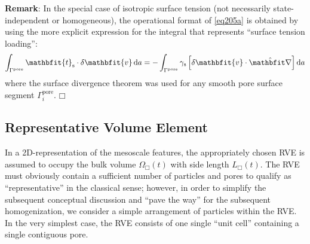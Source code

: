 \documentclass[12pt,a4paper,fleqn]{article}
\renewcommand{\ta}[1]{\mathbfit{#1}}
\renewcommand{\Box}{\mdlgwhtsquare}
\newcommand{\pore}{\mathrm{pore}}
\newcommand{\surf}{\mathrm{s}}
\begin{document}
\textbf{Remark}: In the special case of isotropic surface tension (not necessarily state-independent or homogeneous), the operational format of \eqref{eq205a} is obtained by using the more explicit expression for the integral that represents ``surface tension loading'':
\begin{equation}
    \int_{\Gamma^\pore} \ta{t}_\surf \cdot \delta\ta{v} \dif a =
    -\int_{\Gamma^\pore} \gamma_\surf\left[\delta\ta{v}\cdot\hat{\diff}\right] \dif a
\label{eq206}
\end{equation}
where the surface divergence theorem was used for any smooth pore surface segment $\Gamma^\pore_i$. $\Box$

\subsection{Representative Volume Element}

In a 2D-representation of the mesoscale features, the appropriately chosen RVE is assumed to occupy the bulk volume $\Omega_\Box(t)$ with side length $L_\Box(t)$. The RVE must obviously contain a sufficient number of particles and pores to qualify as ``representative'' in the classical sense; however, in order to simplify the subsequent conceptual discussion and ``pave the way'' for the subsequent homogenization, we consider a simple arrangement of particles within the RVE. In the very simplest case, the RVE consists of one single ``unit cell'' containing a single contiguous pore.
\end{document}
